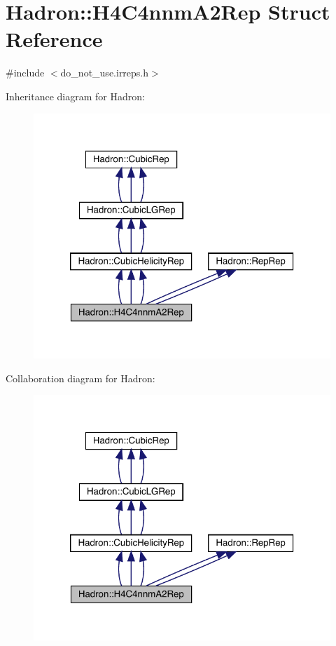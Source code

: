 \hypertarget{structHadron_1_1H4C4nnmA2Rep}{}\section{Hadron\+:\+:H4\+C4nnm\+A2\+Rep Struct Reference}
\label{structHadron_1_1H4C4nnmA2Rep}


{\ttfamily \#include $<$do\+\_\+not\+\_\+use.\+irreps.\+h$>$}



Inheritance diagram for Hadron\+:
\nopagebreak
\begin{figure}[H]
\begin{center}
\leavevmode
\includegraphics[width=320pt]{de/dca/structHadron_1_1H4C4nnmA2Rep__inherit__graph}
\end{center}
\end{figure}


Collaboration diagram for Hadron\+:
\nopagebreak
\begin{figure}[H]
\begin{center}
\leavevmode
\includegraphics[width=320pt]{d5/d16/structHadron_1_1H4C4nnmA2Rep__coll__graph}
\end{center}
\end{figure}
